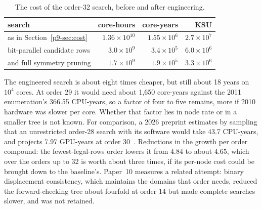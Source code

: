 \documentclass[11pt,a4paper,oneside]{report}
\theoremstyle{definition}
\begin{document}
\begin{table}[H]
\centering
\small
\begin{tabular}{@{}lrrr@{}}
\toprule
search & core-hours & core-years & KSU \\
\midrule
as in Section~\ref{p9-sec:cost} & $1.36\times10^{10}$ & $1.55\times10^6$ & $2.7\times10^7$ \\
bit-parallel candidate rows & $3.0\times10^{9}$ & $3.4\times10^5$ & $6.0\times10^6$ \\
and full symmetry pruning & $1.7\times10^{9}$ & $1.9\times10^5$ & $3.3\times10^6$ \\
\bottomrule
\end{tabular}
\caption{The cost of the order-32 search, before and after engineering.}
\label{p9-tab:revised}
\end{table}

\noindent The engineered search is about eight times cheaper, but still about 18 years on $10^4$ cores. At
order 29 it would need about 1{,}650 core-years against the 2011 enumeration's 366.55 CPU-years, so a factor
of four to five remains, more if 2010 hardware was slower per core. Whether that factor lies in node rate or
in a smaller tree is not known. For comparison, a 2026 preprint estimates by sampling that an
unrestricted order-28 search with its software would take 43.7 CPU-years, and projects 7.97 GPU-years
at order 30~\cite{p9-dumitru2026localpatterns}. Reductions in the growth per order compound: the fewest-legal-rows order
lowers it from $4.84$ to about $4.65$, which over the orders up to 32 is worth about three times, if its
per-node cost could be brought down to the baseline's. Paper~10 measures a related attempt: binary
displacement consistency, which maintains the domains that order needs, reduced the forward-checking tree
about fourfold at order 14 but made complete searches slower, and was not retained.
\end{document}
